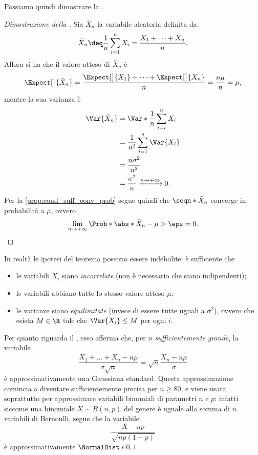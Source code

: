 Possiamo quindi dimostrare la .
\begin{proof}
    [Dimostrazione della ]
    Sia $\bar X_n$ la variabile aleatoria definita da: \[
        \bar X_n \deq \frac{1}{n}\sum_{i = 1}^{n}X_i = \frac{X_1 + \dots + X_n}{n}.
    \] Allora si ha che il valore atteso di $\bar X_n$ è \[
       \Expect[\big]{\bar X_n} = \frac{\Expect[\big]{X_1} + \dots + \Expect[\big]{X_n}}{n} = \frac{n\mu}{n} = \mu, 
    \] mentre la sua varianza è \begin{align*}
        \Var{\bar X_n} 
        &= \Var*{\frac1n \sum_{i = i}^n X_i} \\
        &= \frac{1}{n^2} \sum_{i = 1}^n \Var{X_i}\\
        &= \frac{n\sigma^2}{n^2}\\
        &= \frac{\sigma^2}{n} \xrightarrow{n \to +\infty} 0.
    \end{align*} Per la \autoref{prop:cond_suff_conv_prob} segue quindi che $\seqn*{\bar X_n}$ converge in probabilità a $\mu$, ovvero \[
        \lim_{n \to +\infty} \Prob*{\abs*{\bar X_n - \mu} > \eps} = 0. \qedhere
    \]
\end{proof}

In realtà le ipotesi del teorema possono essere indebolite: è sufficiente che 
\begin{itemize}
    \item le variabili $X_i$ siano \emph{incorrelate} (non è necessario che siano indipendenti);
    \item le variabili abbiano tutte lo stesso valore atteso $\mu$;
    \item le varianze siano \emph{equilimitate} (invece di essere tutte uguali a $\sigma^2$), ovvero che esista $M \in \R$ tale che $\Var{X_i} \leq M$ per ogni $i$.
\end{itemize}

Per quanto riguarda il , esso afferma che, per $n$ \emph{sufficientemente grande}, la variabile \[
    \frac{X_1 + \dots + X_n - n\mu}{\sigma\sqrt{n}} = \sqrt{n} \frac{\bar X_n - n\mu}{\sigma}    
\] è approssimativamente una Gaussiana standard. Questa approssimazione comincia a diventare sufficientemente precisa per $n \geq 80$, e viene usata soprattutto per approssimare variabili binomiali di parametri $n$ e $p$: infatti siccome una binomiale $X \sim B(n, p)$ del genere è uguale alla somma di $n$ variabili di Bernoulli, segue che la variabile \[
    \frac{X - np}{\sqrt{np(1-p)}}
\] è approssimativamente $\NormalDist*{0, 1}$.